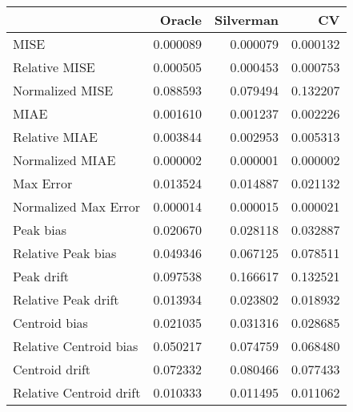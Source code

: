 \begin{tabular}{lrrr}
  \hline
 & Oracle & Silverman & CV \\ 
  \hline
MISE & 0.000089 & 0.000079 & 0.000132 \\ 
  Relative MISE & 0.000505 & 0.000453 & 0.000753 \\ 
  Normalized MISE & 0.088593 & 0.079494 & 0.132207 \\ 
  MIAE & 0.001610 & 0.001237 & 0.002226 \\ 
  Relative MIAE & 0.003844 & 0.002953 & 0.005313 \\ 
  Normalized MIAE & 0.000002 & 0.000001 & 0.000002 \\ 
  Max Error & 0.013524 & 0.014887 & 0.021132 \\ 
  Normalized Max Error & 0.000014 & 0.000015 & 0.000021 \\ 
  Peak bias & 0.020670 & 0.028118 & 0.032887 \\ 
  Relative Peak bias & 0.049346 & 0.067125 & 0.078511 \\ 
  Peak drift & 0.097538 & 0.166617 & 0.132521 \\ 
  Relative Peak drift & 0.013934 & 0.023802 & 0.018932 \\ 
  Centroid bias & 0.021035 & 0.031316 & 0.028685 \\ 
  Relative Centroid bias & 0.050217 & 0.074759 & 0.068480 \\ 
  Centroid drift & 0.072332 & 0.080466 & 0.077433 \\ 
  Relative Centroid drift & 0.010333 & 0.011495 & 0.011062 \\ 
   \hline
\end{tabular}

